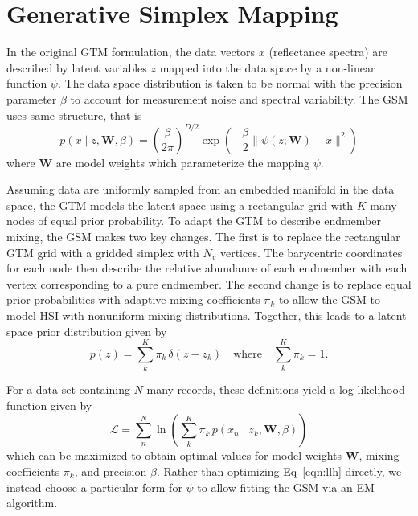 \documentclass[remotesensing,article,submit,pdftex,moreauthors]{Definitions/mdpi}
\begin{document}
\section{Generative Simplex Mapping}\label{sec:gsm}

In the original GTM formulation, the data vectors $x$ (reflectance spectra) are described by latent variables $z$ mapped into the data space by a non-linear function $\psi$. The data space distribution is taken to be normal with the precision parameter $\beta$ to account for measurement noise and spectral variability. The GSM uses same structure, that is
\begin{equation}\label{eqn:data-space-distribution}
    p(x \mid z, \mathbf{W}, \beta) = \left(\frac{\beta}{2\pi} \right)^{D/2}\exp\left( -\frac{\beta}{2}\lVert \psi(z; \mathbf{W}) - x \rVert^2 \right)
\end{equation}
where $\mathbf{W}$ are model weights which parameterize the mapping $\psi$.

Assuming data are uniformly sampled from an embedded manifold in the data space, the GTM models the latent space using a rectangular grid with $K$-many nodes of equal prior probability. To adapt the GTM to describe endmember mixing, the GSM makes two key changes. The first is to replace the rectangular GTM grid with a gridded simplex with $N_v$ vertices. The barycentric coordinates for each node then describe the relative abundance of each endmember with each vertex corresponding to a pure endmember. The second change is to replace equal prior probabilities with adaptive mixing coefficients $\pi_k$ to allow the GSM to model HSI with nonuniform mixing distributions. Together, this leads to a latent space prior distribution given by
\begin{equation}\label{eqn:latent-distribution}
    p(z) = \sum\limits_k^K \pi_k \, \delta(z - z_k) \quad\text{where}\quad  \sum_k^K\pi_k = 1.
\end{equation}

For a data set containing $N$-many records, these definitions yield a log likelihood function given by
\begin{equation}\label{eqn:llh}
    \mathcal{L} = \sum\limits_n^N \ln \left( \sum\limits_k^K \pi_k \, p(x_n \mid z_k, \mathbf{W}, \beta) \right)
\end{equation}
which can be maximized to obtain optimal values for model weights $\mathbf{W}$, mixing coefficients $\pi_k$, and precision $\beta$. Rather than optimizing Eq~\ref{eqn:llh} directly, we instead choose a particular form for $\psi$ to allow fitting the GSM via an EM algorithm.
\end{document}

